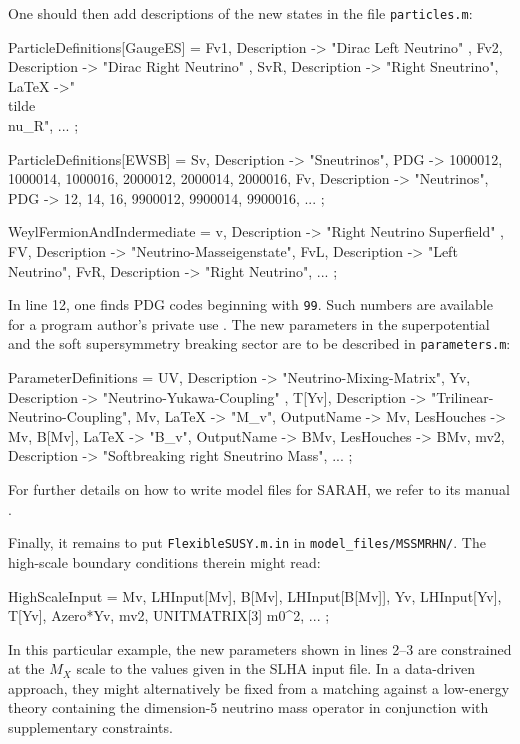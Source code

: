 \documentclass[final,3p,11pt,pdflatex]{elsarticle}
\makeatletter
\newcommand{\sarah}{SARAH\@\xspace}
\newcommand{\code}[1]{\lstinline|#1|}  %
\makeatother
\begin{document}
One should then add descriptions of the new states in the file
\code{particles.m}:
\begin{numlstlisting}
ParticleDefinitions[GaugeES] = {
  {Fv1, { Description -> "Dirac Left Neutrino" }},
  {Fv2, { Description -> "Dirac Right Neutrino" }},
  {SvR, { Description -> "Right Sneutrino", LaTeX ->"\\tilde{\\nu}_R"}},
  ...
};

ParticleDefinitions[EWSB] = {
  {Sv, { Description -> "Sneutrinos",
         PDG -> {1000012, 1000014, 1000016, 2000012, 2000014, 2000016}}},
  {Fv, { Description -> "Neutrinos",
         PDG -> {12, 14, 16, 9900012, 9900014, 9900016}}},
  ...
};

WeylFermionAndIndermediate = {
  {v,   { Description -> "Right Neutrino Superfield" }},
  {FV,  { Description -> "Neutrino-Masseigenstate"}},
  {FvL, { Description -> "Left Neutrino"}},
  {FvR, { Description -> "Right Neutrino"}},
  ...
};
\end{numlstlisting}
In line 12, one finds PDG codes beginning with \code{99}.
Such numbers are available for a program author's private use
\cite{Beringer:1900zz}.
The new parameters in the superpotential
and the soft supersymmetry breaking sector
are to be described in \code{parameters.m}:
\begin{numlstlisting}
ParameterDefinitions = {
  {UV,    { Description -> "Neutrino-Mixing-Matrix"}},
  {Yv,    { Description -> "Neutrino-Yukawa-Coupling" }},
  {T[Yv], { Description -> "Trilinear-Neutrino-Coupling"}},
  {Mv,    { LaTeX -> "M_v", OutputName -> Mv, LesHouches -> Mv}},
  {B[Mv], { LaTeX -> "B_v", OutputName -> BMv, LesHouches -> BMv}},
  {mv2,   { Description -> "Softbreaking right Sneutrino Mass"}},
  ...
};
\end{numlstlisting}
For further details on how to write model files for \sarah, we refer
to its manual \cite{Staub:2008uz,Staub:2013tta}.

Finally, it remains to put \code{FlexibleSUSY.m.in}
in \code{model_files/MSSMRHN/}.
The high-scale boundary conditions therein might read:
\begin{numlstlisting}
HighScaleInput = {
  {Mv, LHInput[Mv]}, {B[Mv], LHInput[B[Mv]]},
  {Yv, LHInput[Yv]}, {T[Yv], Azero*Yv},
  {mv2, UNITMATRIX[3] m0^2},
  ...
};
\end{numlstlisting}
In this particular example,
the new parameters shown in lines 2--3
are constrained at the $M_X$ scale
to the values given in the SLHA input file.
In a data-driven approach,
they might alternatively be fixed from a matching against
a low-energy theory containing the dimension-5
neutrino mass operator in conjunction with supplementary constraints.
\end{document}
